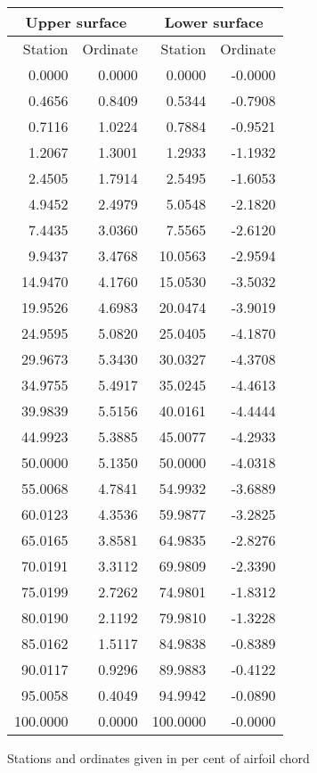 \documentclass[11pt]{book}
\begin{document}
 \hspace{4mm}
 \begin{tabular}{|r|r|r|r|} \hline 
 \multicolumn{2}{|c|}{Upper surface} & \multicolumn{2}{|c|}{Lower surface} \\
 \hline
 Station & Ordinate & Station & Ordinate \\
 \hline
0.0000 & 0.0000 & 0.0000 & -0.0000 \\
0.4656 & 0.8409 & 0.5344 & -0.7908 \\
0.7116 & 1.0224 & 0.7884 & -0.9521 \\
1.2067 & 1.3001 & 1.2933 & -1.1932 \\
2.4505 & 1.7914 & 2.5495 & -1.6053 \\
4.9452 & 2.4979 & 5.0548 & -2.1820 \\
7.4435 & 3.0360 & 7.5565 & -2.6120 \\
9.9437 & 3.4768 & 10.0563 & -2.9594 \\
14.9470 & 4.1760 & 15.0530 & -3.5032 \\
19.9526 & 4.6983 & 20.0474 & -3.9019 \\
24.9595 & 5.0820 & 25.0405 & -4.1870 \\
29.9673 & 5.3430 & 30.0327 & -4.3708 \\
34.9755 & 5.4917 & 35.0245 & -4.4613 \\
39.9839 & 5.5156 & 40.0161 & -4.4444 \\
44.9923 & 5.3885 & 45.0077 & -4.2933 \\
50.0000 & 5.1350 & 50.0000 & -4.0318 \\
55.0068 & 4.7841 & 54.9932 & -3.6889 \\
60.0123 & 4.3536 & 59.9877 & -3.2825 \\
65.0165 & 3.8581 & 64.9835 & -2.8276 \\
70.0191 & 3.3112 & 69.9809 & -2.3390 \\
75.0199 & 2.7262 & 74.9801 & -1.8312 \\
80.0190 & 2.1192 & 79.9810 & -1.3228 \\
85.0162 & 1.5117 & 84.9838 & -0.8389 \\
90.0117 & 0.9296 & 89.9883 & -0.4122 \\
95.0058 & 0.4049 & 94.9942 & -0.0890 \\
100.0000 & 0.0000 & 100.0000 & -0.0000 \\
 \hline 
 \end{tabular}
 \vspace{8mm}

Stations and ordinates given in per cent of airfoil chord
\end{document}
